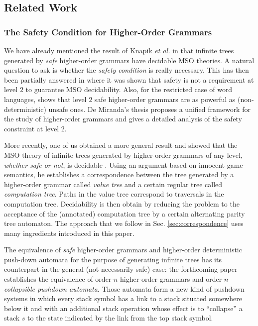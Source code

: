 \documentclass{llncs}
\begin{document}
\subsection{Related Work}

\subsubsection{The Safety Condition for Higher-Order Grammars}

We have already mentioned the result of Knapik \emph{et al.} in \cite{KNU02} that infinite trees generated by \emph{safe} higher-order grammars have decidable MSO theories. 
A natural question to ask is whether the \emph{safety condition} is really necessary. 
This has then been partially answered in \cite{DBLP:conf/tlca/AehligMO05} where it was shown that safety is not a requirement at level $2$ to guarantee MSO decidability. Also, for the restricted case of word languages, \cite{DBLP:conf/fossacs/AehligMO05} shows that level $2$ safe higher-order grammars are as powerful as (non-deterministic) unsafe ones. 
De Miranda's thesis \cite{demirandathesis} proposes a unified framework for the study of higher-order grammars and gives a detailed analysis of the safety constraint at level 2.

More recently, one of us obtained a more general result and showed that the MSO theory of infinite trees generated by higher-order grammars of any level, \emph{whether safe or not}, is decidable \cite{OngLics2006}.
Using an argument based on innocent game-semantics, he establishes a correspondence between the tree generated by a higher-order grammar called \emph{value tree} and a certain regular tree called  \emph{computation tree}. Paths in the value tree correspond to traversals in the computation tree.
Decidability is then obtain by reducing the problem to the acceptance of the (annotated) computation tree by a certain alternating parity tree automaton.
The approach that we follow in Sec. \ref{sec:correspondence} uses many ingredients introduced in this paper.


The equivalence of \emph{safe} higher-order grammars and
higher-order deterministic push-down automata
for the purpose of generating infinite trees \cite{KNU02}
has its counterpart in the general (not necessarily safe) case:
the forthcoming paper \cite{hague-sto07} establishes the equivalence of order-$n$ higher-order grammars and order-$n$ \emph{collapsible pushdown automata}. Those automata form a new kind of pushdown systems in which every stack symbol has a link to a stack situated somewhere below it and with an additional stack operation whose effect is to ``collapse'' a stack $s$ to the state indicated by the link from the top stack symbol.
\end{document}
